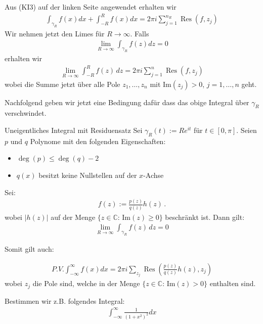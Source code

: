 \documentclass[a4paper,10pt]{article}
\def\Im{\text{Im}}
\begin{document}
Aus (KI3) auf der linken Seite angewendet erhalten wir \begin{align*} \int_{\gamma_R} f(x) dx+\int_{-R}^{R} f(x) dx=2\pi i\sum_{j=1}^{n_R}\operatorname{Res}(f,z_j) \end{align*} Wir nehmen jetzt den Limes für \(R \to \infty\). Falls \begin{align*} \lim_{R\to \infty} \int_{\gamma_R} f(z)dz = 0  \end{align*} erhalten wir \begin{align*} \lim_{R\to\infty}\int_{-R}^Rf(z)\,dz=2\pi i\sum_{j=1}^{n}\operatorname{Res}(f,z_j) \end{align*} wobei die Summe jetzt über alle Pole \(z_1,\dots, z_n\) mit \(\Im(z_j)>0\), \(j=1,\dots,n\) geht.

Nachfolgend geben wir jetzt eine Bedingung dafür dass das obige Integral über $\gamma_R$ verschwindet.

\begin{subbox}{Uneigentliches Integral mit Residuensatz}
  Sei \(\gamma_R(t):=Re^{ i t}\) für \(t\in[0,\pi]\). Seien \(p\) und \(q\) Polynome mit den folgenden Eigenschaften:
  \begin{itemize}
    \item \(\deg(p)\leq \deg(q)-2\)
    \item \(q(x)\) besitzt keine Nullstellen auf der \(x\)-Achse
  \end{itemize}


Sei: \begin{align*} f(z) := \frac{p(z)}{q(z)}h(z)\,. \end{align*} wobei \(|h(z)|\) auf der Menge \(\{z\in\mathbb{C}:\,\Im(z)\geq0\}\) beschränkt ist. Dann gilt: \begin{align*} \lim_{R\to \infty} \int_{\gamma_R} f(z)\,dz = 0 \end{align*}

Somit gilt auch:

\begin{align*} P.V.\int_{-\infty}^\infty f(x) dx = 2 \pi i \sum_{z_j}\operatorname{Res} \left( \frac{p(z)}{q(z)}h(z),z_j \right) \end{align*} wobei \(z_j\) die Pole sind, welche in der Menge \(\{z\in\mathbb{C}:\,\Im(z)>0\}\) enthalten sind.

\end{subbox}

Bestimmen wir z.B. folgendes Integral: \begin{align*} \int_{-\infty}^{\infty} \frac{1}{(1+x^2)^2}dx\end{align*}
\end{document}
